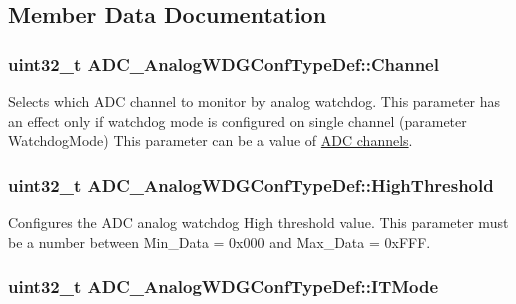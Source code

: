 \subsection{Member Data Documentation}
\hypertarget{struct_a_d_c___analog_w_d_g_conf_type_def_abc86b5861e3eff802fe765e62054f348}{
\subsubsection[{Channel}]{\setlength{\rightskip}{0pt plus 5cm}uint32\-\_\-t A\-D\-C\-\_\-\-Analog\-W\-D\-G\-Conf\-Type\-Def\-::\-Channel}}\label{struct_a_d_c___analog_w_d_g_conf_type_def_abc86b5861e3eff802fe765e62054f348}
Selects which A\-D\-C channel to monitor by analog watchdog. This parameter has an effect only if watchdog mode is configured on single channel (parameter Watchdog\-Mode) This parameter can be a value of \hyperlink{group___a_d_c__channels}{A\-D\-C channels}. \hypertarget{struct_a_d_c___analog_w_d_g_conf_type_def_a9bee62b3d364713a16a15cefcc217e65}{
\subsubsection[{High\-Threshold}]{\setlength{\rightskip}{0pt plus 5cm}uint32\-\_\-t A\-D\-C\-\_\-\-Analog\-W\-D\-G\-Conf\-Type\-Def\-::\-High\-Threshold}}\label{struct_a_d_c___analog_w_d_g_conf_type_def_a9bee62b3d364713a16a15cefcc217e65}
Configures the A\-D\-C analog watchdog High threshold value. This parameter must be a number between Min\-\_\-\-Data = 0x000 and Max\-\_\-\-Data = 0x\-F\-F\-F. \hypertarget{struct_a_d_c___analog_w_d_g_conf_type_def_ab67703b11dbb0303fb5b56bd328ef06d}{
\subsubsection[{I\-T\-Mode}]{\setlength{\rightskip}{0pt plus 5cm}uint32\-\_\-t A\-D\-C\-\_\-\-Analog\-W\-D\-G\-Conf\-Type\-Def\-::\-I\-T\-Mode}}\label{struct_a_d_c___analog_w_d_g_conf_type_def_ab67703b11dbb0303fb5b56bd328ef06d}
